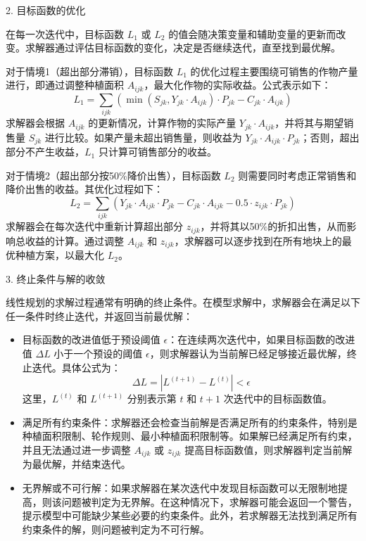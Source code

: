 \documentclass[12pt,a4paper]{nmmcm}
\begin{document}
2. 目标函数的优化

在每一次迭代中，目标函数 $L_1$ 或 $L_2$ 的值会随决策变量和辅助变量的更新而改变。求解器通过评估目标函数的变化，决定是否继续迭代，直至找到最优解。

对于情境1（超出部分滞销），目标函数 $L_1$ 的优化过程主要围绕可销售的作物产量进行，即通过调整种植面积 $A_{ijk}$，最大化作物的实际收益。公式表示如下：
\[
L_1 = \sum_{ijk} \left( \min(S_{jk}, Y_{jk} \cdot A_{ijk}) \cdot P_{jk} - C_{jk} \cdot A_{ijk} \right)
\]
求解器会根据 $A_{ijk}$ 的更新情况，计算作物的实际产量 $Y_{jk} \cdot A_{ijk}$，并将其与期望销售量 $S_{jk}$ 进行比较。如果产量未超出销售量，则收益为 $Y_{jk} \cdot A_{ijk} \cdot P_{jk}$；否则，超出部分不产生收益，$L_1$ 只计算可销售部分的收益。

对于情境2（超出部分按50\%降价出售），目标函数 $L_2$ 则需要同时考虑正常销售和降价出售的收益。其优化过程如下：
\[
L_2 = \sum_{ijk} \left( Y_{jk} \cdot A_{ijk} \cdot P_{jk} - C_{jk} \cdot A_{ijk} - 0.5 \cdot z_{ijk} \cdot P_{jk} \right)
\]
求解器会在每次迭代中重新计算超出部分 $z_{ijk}$，并将其以50\%的折扣出售，从而影响总收益的计算。通过调整 $A_{ijk}$ 和 $z_{ijk}$，求解器可以逐步找到在所有地块上的最优种植方案，以最大化 $L_2$。

 3. 终止条件与解的收敛

线性规划的求解过程通常有明确的终止条件。在模型求解中，求解器会在满足以下任一条件时终止迭代，并返回当前最优解：
\begin{itemize}
    \item 目标函数的改进值低于预设阈值 $\epsilon$：在连续两次迭代中，如果目标函数的改进值 $\Delta L$ 小于一个预设的阈值 $\epsilon$，则求解器认为当前解已经足够接近最优解，终止迭代。具体公式为：
    \[
    \Delta L = |L^{(t+1)} - L^{(t)}| < \epsilon
    \]
    这里，$L^{(t)}$ 和 $L^{(t+1)}$ 分别表示第 $t$ 和 $t+1$ 次迭代中的目标函数值。

    \item 满足所有约束条件：求解器还会检查当前解是否满足所有的约束条件，特别是种植面积限制、轮作规则、最小种植面积限制等。如果解已经满足所有约束，并且无法通过进一步调整 $A_{ijk}$ 或 $z_{ijk}$ 提高目标函数值，则求解器判定当前解为最优解，并结束迭代。

    \item 无界解或不可行解：如果求解器在某次迭代中发现目标函数可以无限制地提高，则该问题被判定为无界解。在这种情况下，求解器可能会返回一个警告，提示模型中可能缺少某些必要的约束条件。此外，若求解器无法找到满足所有约束条件的解，则问题被判定为不可行解。
\end{itemize}
\end{document}
